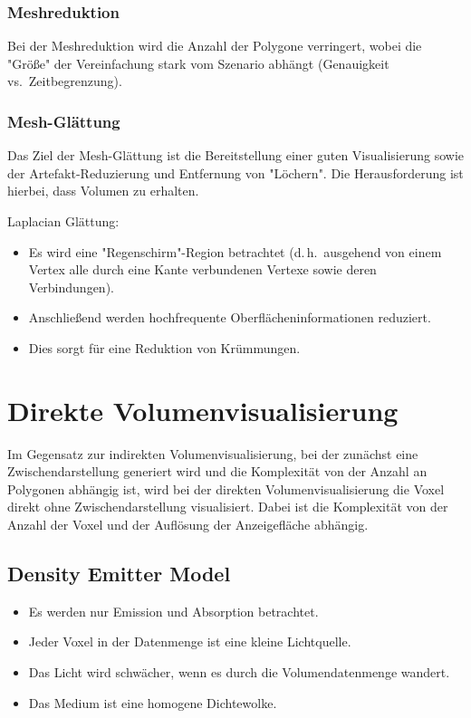 \documentclass[a4paper, 11pt, accentcolor = tud3b]{tudreport}
\renewcommand{\dh}{d.\,h.~}
\newcommand{\vs}{vs.~}
\begin{document}
				\subsubsection{Meshreduktion}
					Bei der Meshreduktion wird die Anzahl der Polygone verringert, wobei die "Größe" der Vereinfachung stark vom Szenario abhängt (Genauigkeit \vs Zeitbegrenzung).

				\subsubsection{Mesh-Glättung}
					Das Ziel der Mesh-Glättung ist die Bereitstellung einer guten Visualisierung sowie der Artefakt-Reduzierung und Entfernung von "Löchern". Die Herausforderung ist hierbei, dass Volumen zu erhalten.
					
					Laplacian Glättung:
					\begin{itemize}
						\item Es wird eine "Regenschirm"-Region betrachtet (\dh ausgehend von einem Vertex alle durch eine Kante verbundenen Vertexe sowie deren Verbindungen).
						\item Anschließend werden hochfrequente Oberflächeninformationen reduziert.
						\item Dies sorgt für eine Reduktion von Krümmungen.
					\end{itemize}

		\section{Direkte Volumenvisualisierung}
			Im Gegensatz zur indirekten Volumenvisualisierung, bei der zunächst eine Zwischendarstellung generiert wird und die Komplexität von der Anzahl an Polygonen abhängig ist, wird bei der direkten Volumenvisualisierung die Voxel direkt ohne Zwischendarstellung visualisiert. Dabei ist die Komplexität von der Anzahl der Voxel und der Auflösung der Anzeigefläche abhängig.

			\subsection{Density Emitter Model}
				\begin{itemize}
					\item Es werden nur Emission und Absorption betrachtet.
					\item Jeder Voxel in der Datenmenge ist eine kleine Lichtquelle.
					\item Das Licht wird schwächer, wenn es durch die Volumendatenmenge wandert.
					\item Das Medium ist eine homogene Dichtewolke.
				\end{itemize}
			
\end{document}
